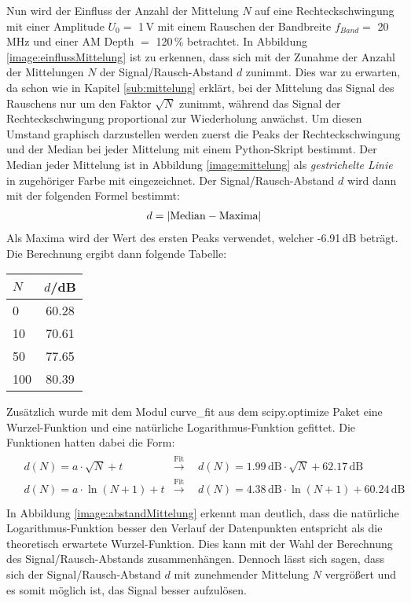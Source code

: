 Nun wird der Einfluss der Anzahl der Mittelung $N$ auf eine Rechteckschwingung mit einer Amplitude $U_0=$ 1\,V mit einem Rauschen der Bandbreite $f_{Band}=$ 20\,MHz und einer AM Depth $=$ 120\,\% betrachtet.
In Abbildung \ref{image:einflussMittelung} ist zu erkennen, dass sich mit der Zunahme der Anzahl der Mittelungen $N$ der Signal/Rausch-Abstand $d$ zunimmt. Dies war zu erwarten, da schon wie in Kapitel \ref{sub:mittelung} erklärt, bei der Mittelung das Signal des Rauschens nur um den Faktor $\sqrt{N}$ zunimmt, während das Signal der Rechteckschwingung proportional zur Wiederholung anwächst. Um diesen Umstand graphisch darzustellen werden zuerst die Peaks der Rechteckschwingung und der Median bei jeder Mittelung mit einem Python-Skript bestimmt. Der Median jeder Mittelung ist in Abbildung \ref{image:mittelung} als \textit{gestrichelte Linie} in zugehöriger Farbe mit eingezeichnet. Der Signal/Rausch-Abstand $d$ wird dann mit der folgenden Formel bestimmt:
\begin{gather}
    d = \abs{\text{Median} - \text{Maxima}}
\end{gather}
Als Maxima wird der Wert des ersten Peaks verwendet, welcher -6.91\,dB beträgt. Die Berechnung ergibt dann folgende Tabelle:
\begin{center}
    \begin{tabular}{l | c}
        $N$ & $d$/dB\\
        \hline
        0   & 60.28 \\
        10  & 70.61 \\
        50  & 77.65 \\
        100 & 80.39 \\
    \end{tabular}
\end{center}
Zusätzlich wurde mit dem Modul curve\_fit aus dem scipy.optimize Paket eine Wurzel-Funktion und eine natürliche Logarithmus-Funktion gefittet. Die Funktionen hatten dabei die Form:
\begin{gather}
    \begin{aligned}
       &d(N) = a\cdot\sqrt{N} + t &\xrightarrow{\text{Fit}} &~~d(N) = 1.99\,\text{dB}\cdot\sqrt{N} + 62.17\,\text{dB} \\
       &d(N) = a\cdot\ln(N+1) + t &\xrightarrow{\text{Fit}} &~~d(N) = 4.38\,\text{dB}\cdot\ln(N+1) + 60.24\,\text{dB} \\
    \end{aligned}
\end{gather}
In Abbildung \ref{image:abstandMittelung} erkennt man deutlich, dass die natürliche Logarithmus-Funktion besser den Verlauf der Datenpunkten entspricht als die theoretisch erwartete Wurzel-Funktion. Dies kann mit der Wahl der Berechnung des Signal/Rausch-Abstands zusammenhängen. Dennoch lässt sich sagen, dass sich der Signal/Rausch-Abstand $d$ mit zunehmender Mittelung $N$ vergrößert und es somit möglich ist, das Signal besser aufzulösen.
